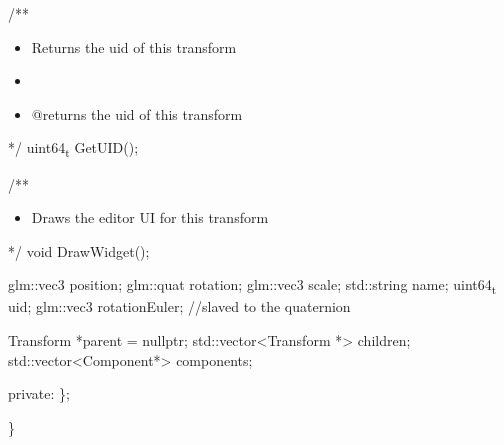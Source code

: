 \documentclass[11pt]{article}
\begin{document}
/**
\begin{itemize}
\item Returns the uid of this transform
\item 

\item @returns the uid of this transform
\end{itemize}
 */
uint64\textsubscript{t} GetUID();


/**
\begin{itemize}
\item Draws the editor UI for this transform
\end{itemize}
 */
void DrawWidget();

glm::vec3 position;
glm::quat rotation;
glm::vec3 scale;
std::string name;
uint64\textsubscript{t} uid;
glm::vec3 rotationEuler; //slaved to the quaternion

Transform *parent = nullptr;
std::vector<Transform *> children;
std::vector<Component*> components;

private:
\};

\}
\end{document}
